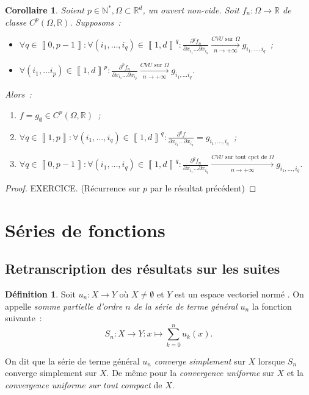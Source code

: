 \documentclass{report}
\newtheorem{cor}[thm]{Corollaire}
\theoremstyle{definition}
\newtheorem{déf}[thm]{Définition}
\theoremstyle{remark}
\numberwithin{equation}{section}
\newcommand{\R}{\mathbb R}
\newcommand{\N}{\mathbb N}
\newcommand{\CONV}[5]{\xrightarrow[#2 \to #3]{#4 \text{ #5 } #1}}
\newcommand{\CVU}[3]{\CONV{#1}{#2}{#3}{CVU}{sur}}
\newcommand{\CVUc}[3]{\CONV{#1}{#2}{#3}{CVU}{sur tout cpct de}}
\newcommand{\intint}[2]{\left\llbracket#1, #2\right\rrbracket}
\newcommand{\pinfty}{{+\infty}}
\newcommand{\evn}{espace vectoriel normé }
\begin{document}
			\begin{cor} Soient $p \in \N^*, \Omega \subset \R^d$, un ouvert non-vide. Soit $f_n : \Omega \to \R$ de classe $C^p(\Omega, \R)$. Supposons~:
			\begin{itemize}
				\item $\displaystyle \forall q \in \intint 0{p-1} : \forall (i_1, \ldots, i_q) \in \intint 1d^q :
					\frac {\partial^qf_n}{\partial x_{i_1}\ldots\partial x_{i_q}} \CVU \Omega n\pinfty g_{i_1, \ldots, i_q}$~;
				\item $\displaystyle \forall (i_1, \ldots i_p) \in \intint 1d^p :
					\frac {\partial^pf_n}{\partial x_{i_1}\ldots\partial x_{i_p}} \CVU \Omega n\pinfty g_{i_1, \ldots i_q}$.
			\end{itemize}
			Alors~:
			\begin{enumerate}
				\item $f = g_\emptyset \in C^p(\Omega, \R)$~;
				\item $\displaystyle \forall q \in \intint 1p : \forall (i_1, \ldots, i_q) \in \intint 1d^q :
					\frac {\partial^qf}{\partial x_{i_1}\ldots\partial x_{i_q}} = g_{i_1, \ldots, i_q}$~;
				\item $\forall q \in \intint 0{p-1} : \forall (i_1, \ldots, i_q) \in \intint 1d^q :
					\frac {\partial^qf_n}{\partial x_{i_1}\ldots\partial x_{i_q}} \CVUc \Omega n\pinfty g_{i_1, \ldots, i_q}$.
			\end{enumerate}
			\end{cor}

			\begin{proof} EXERCICE. (Récurrence sur $p$ par le résultat précédent)
			\end{proof}

	\section{Séries de fonctions}
		\subsection{Retranscription des résultats sur les suites}
			\begin{déf} Soit $u_n : X \to Y$ où $X \neq \emptyset$ et $Y$ est un \evn. On appelle \textit{somme partielle d'ordre $n$ de la série de terme
			général $u_n$} la fonction suivante~:
			\begin{equation}
				S_n : X \to Y : x \mapsto \sum_{k=0}^nu_k(x).
			\end{equation}

			On dit que la série de terme général $u_n$ \textit{converge simplement} sur $X$ lorsque $S_n$ converge simplement sur $X$. De même pour la
			\textit{convergence uniforme} sur $X$ et la \textit{convergence uniforme sur tout compact} de $X$.
			\end{déf}
\end{document}
